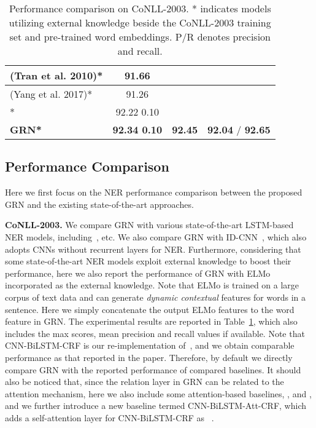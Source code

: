 \documentclass[letterpaper]{article} \usepackage{aaai19}  \usepackage{times}  \usepackage{helvet}  \usepackage{courier}  \usepackage{url}  \usepackage{graphicx}  \usepackage{amsmath}
\newcommand{\ie}{\text{i.e.,}}
\newcommand{\GRN}{GRN}
\begin{document}
\begin{table}[t!]
\begin{adjustbox}{max width=\columnwidth}
\begin{tabular}{|l|c|c|c|}
       (Tran et al. 2010)* & 91.66  & &\\ \hline
       (Yang et al. 2017)* & 91.26 &  &\\ \hline
       \cite{peters2018deep}* & 92.22  0.10 & &\\ \hline
       \textbf{\GRN{}*} & \textbf{92.34  0.10} &\textbf{92.45} &\textbf{92.04} / \textbf{92.65}\\ \hline
    \end{tabular}
    \end{adjustbox}
    \caption{Performance comparison on CoNLL-2003. * indicates models utilizing external knowledge beside the CoNLL-2003 training set and pre-trained word embeddings. P/R denotes precision and recall.}
    \label{tab:compare_conll}
\end{table}

\subsection{Performance Comparison}
Here we first focus on the NER performance comparison between the proposed \GRN{} and the existing state-of-the-art approaches.

\textbf{CoNLL-2003.} We compare \GRN{} with various state-of-the-art LSTM-based NER models, including~\cite{Liu2018Empower,Ye2018HSCRF}, etc. We also compare \GRN{} with ID-CNN~\cite{strubell2017fast}, which also adopts CNNs without recurrent layers for NER. Furthermore, considering that some state-of-the-art NER models exploit external knowledge to boost their performance, here we also report the performance of \GRN{} with ELMo~\cite{peters2018deep} incorporated as the external knowledge. Note that ELMo is trained on a large corpus of text data and can generate \textit{dynamic contextual} features for words in a sentence. Here we simply concatenate the output ELMo features to the word feature in \GRN{}. The experimental results are reported in Table~\ref{tab:compare_conll}, which also includes the max  scores, mean precision and recall values if available. Note that CNN-BiLSTM-CRF is our re-implementation of~\cite{ma2016CNNBLSTMCRF}, and we obtain comparable performance as that reported in the paper. Therefore, by default we directly compare \GRN{} with the reported performance of compared baselines. It should also be noticed that, since the relation layer in \GRN{} can be related to the attention mechanism, here we also include some attention-based baselines, \ie, \cite{rei2016attending} and \cite{zukov2017neural}, and we further introduce a new baseline termed CNN-BiLSTM-Att-CRF, which adds a self-attention layer for CNN-BiLSTM-CRF as ~\cite{zukov2017neural}.
\end{document}

